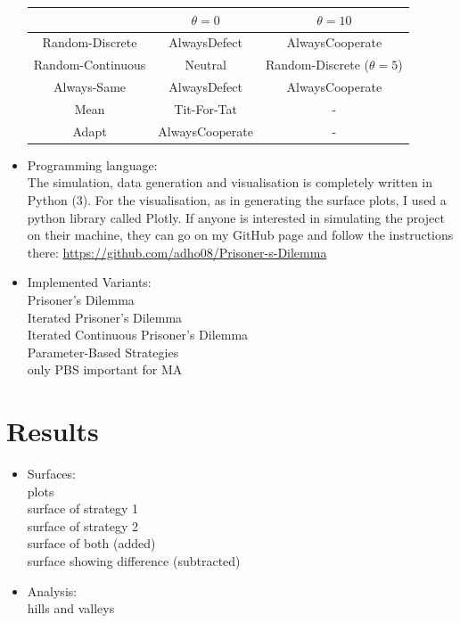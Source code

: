 \documentclass{article}
\begin{document}
\begin{itemize}
\begin{center}
\begin{tabular}{ c|c|c }
   & $\theta = 0$ & $\theta = 10$ \\ 
   \hline
Random-Discrete & AlwaysDefect & AlwaysCooperate \\  
   \hline
Random-Continuous & Neutral & Random-Discrete ($\theta = 5$) \\
   \hline
Always-Same & AlwaysDefect & AlwaysCooperate \\
   \hline
Mean & Tit-For-Tat & - \\
   \hline
Adapt & AlwaysCooperate & - 
\end{tabular}
\end{center}

	\item Programming language:\\

The simulation, data generation and visualisation is completely written in Python (3).
For the visualisation, as in generating the surface plots, I used a python library called Plotly.
If anyone is interested in simulating the project on their machine, they can go on my GitHub page and follow the instructions there:
\href{https://github.com/adho08/Prisoner-s-Dilemma}{https://github.com/adho08/Prisoner-s-Dilemma}

	\item Implemented Variants:\\
		Prisoner's Dilemma\\
		Iterated Prisoner's Dilemma\\
		Iterated Continuous Prisoner's Dilemma\\
		Parameter-Based Strategies\\
		only PBS important for MA\\
	
\end{itemize}

\section{Results}
\begin{itemize}

	\item Surfaces:\\
		plots\\
		surface of strategy 1\\
		surface of strategy 2\\
		surface of both (added)\\
		surface showing difference (subtracted)\\

	\item Analysis:\\
		hills and valleys\\

\end{itemize}
\end{document}
